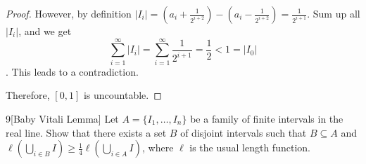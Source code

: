 \documentclass[a4paper, linespread=1.5]{article}
\begin{document}
\begin{proof}
        However, by definition $|I_i| = (a_i + \frac{1}{2^{i + 2}}) - (a_i - \frac{1}{2^{i + 2}}) = \frac{1}{2^{i + 1}}$. Sum up all $|I_i|$, and we get $$\sum_{i = 1}^\infty |I_i| = \sum_{i = 1}^\infty \frac{1}{2^{i + 1}} = \frac{1}{2} < 1 = |I_0|$$. This leads to a contradiction.
        
        Therefore, $[0, 1]$ is uncountable.
    \end{proof}

    \begin{customex}{9}[Baby Vitali Lemma]
        Let $A = \{I_1, \ldots, I_n\}$ be a family of finite intervals in
        the real line. Show that there exists a set $B$ of disjoint intervals such that $B \subseteq A$ and $\ell(\bigcup_{i \in B} I) \geqslant \frac{1}{4} \ell(\bigcup_{i \in A} I)$, where $\ell$ is the usual length function.
    \end{customex}
\end{document}
